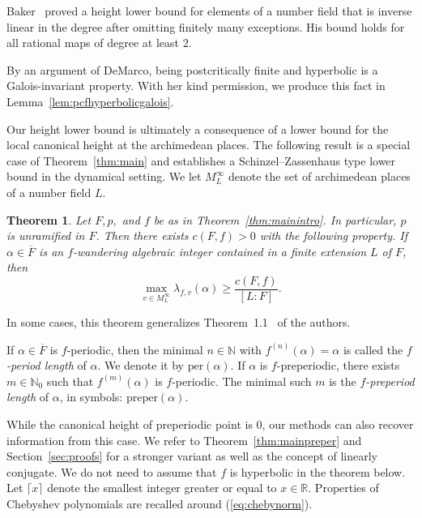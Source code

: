 \documentclass[12pt,oneside,a4]{amsart}
\newcommand{\IN}{\mathbb{N}}
\newcommand{\IR}{\mathbb{R}}
\newcounter{maincounter}
\numberwithin{maincounter}{section}
\numberwithin{equation}{section}
\newtheorem{theorem}[maincounter]{Theorem}
\begin{document}
Baker~\cite{Baker:06} proved a height lower bound for elements of a
number field that is inverse linear in the degree after omitting
finitely many exceptions. His bound holds for all {rational} maps of
degree at least $2$.


By an argument of DeMarco, being postcritically finite and hyperbolic
is a Galois-invariant property. With her kind permission, we produce
this fact in  Lemma~\ref{lem:pcfhyperbolicgalois}. 

Our height lower bound is ultimately a consequence of a lower
bound for the  local canonical height at the archimedean places.
The following result
is a special case of Theorem~\ref{thm:main} and establishes a
Schinzel--Zassenhaus type lower bound in the dynamical setting.
We let $M_L^\infty$
denote the set of archimedean places of a number field $L$. 

\begin{theorem}
  \label{thm:main2intro}
  Let $F,p,$ and $f$ be as in Theorem~\ref{thm:mainintro}.
  In particular, $p$ is unramified in $F$.
  Then there exists $c(F,f)>0$  with the following property.
  If
  $\alpha\in \overline F$ is an $f$-wandering algebraic integer
  contained in a finite extension $L$ of $F$, then
  \begin{equation}
    \label{eq:thmmain2introbound}
    \max_{v\in M_L^\infty}
    \lambda_{f,v}(\alpha) \ge \frac{c(F,f)}{[L:F]}. 
  \end{equation}
\end{theorem}

In some cases, this theorem generalizes Theorem~1.1~\cite{hs:2021lower} of the
authors.

If $\alpha\in \overline F$  is $f$-periodic, then the minimal 
 $n\in\IN$ with $f^{(n)}(\alpha)=\alpha$ is called the
\textit{$f$-period length} of $\alpha$. We denote it by  $\mathrm{per}(\alpha)$.
If $\alpha$ is $f$-preperiodic, there exists
$m\in\IN_0$ such that $f^{(m)}(\alpha)$ is $f$-periodic. The minimal
such $m$ is the \textit{$f$-preperiod length} of $\alpha$, in symbols:
$\mathrm{preper}(\alpha)$. 

While the canonical height of preperiodic point is $0$, our methods
can also recover information from this case.   We refer to Theorem~\ref{thm:mainpreper} and
Section~\ref{sec:proofs} for a stronger variant as well as the concept
of linearly conjugate.
We do not need to assume that $f$ is hyperbolic in the theorem below.
Let $\lceil x\rceil$ denote the smallest integer greater or equal to
$x\in\IR$. Properties of Chebyshev polynomials are recalled around
(\ref{eq:chebynorm}). 
\end{document}
